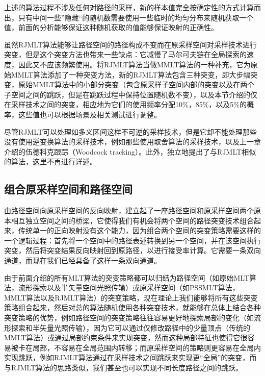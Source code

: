 上述的算法过程不涉及任何对路径的采样，新的样本值完全按确定性的方式计算而出，只有中间一些”隐藏“的随机数需要使用一些临时的均匀分布来随机获取一个值，前面的分析能够保证这种随机获取的值能够保证映射的正确性。

虽然RJMLT算法能够让路径空间的路径构成不变而在原采样空间对采样技术进行突变，但是这个突变方法也带来一些缺点：它减慢了马尔可夫链在全局探索的速度，因此又不应该频繁使用。\cite{a:ReversibleJumpMetropolisLightTransportusingInverseMappings}将RJMLT算法当做MMLT算法的一种补充，它为原始MMLT算法添加了一种突变方法，新的RJMLT算法包含三种突变，即大步幅突变，原始MMLT算法中的小部分突变（包含原采样子空间内部的突变以及在两个子空间之间的跳跃，但是在跳跃过程中保持位置随机数不变），以及本节介绍的仅在采样技术之间的突变，相应地为它们的使用频率分配10\%，85\%，以及5\%的概率，这些值也可以根据场景及相关测试进行调整。

尽管RJMLT可以处理如多义区间这样不可逆的采样技术，但是它却不能处理那些没有使用逆变换算法的采样技术，例如那些使用取舍算法的采样技术，以及上一章介绍的伍德科克跟踪（Woodcock tracking）\cite{a:TechniquesusedintheGEMcodeforMonteCarloneu-tronicscalculationsinreactorsandothersystemsofcomplexgeometry}。此外，\cite{a:ChartedMetropolisLightTransport}独立地提出了与RJMLT相似的算法，这里不再进行详述。





\subsection{组合原采样空间和路径空间}
由路径空间向原采样空间的反向映射，建立起了一座路径空间和原采样空间两个原本相互独立空间之间的桥梁，它使得我们有机会将两个空间的路径突变技术组合起来，传统单一的正向映射没有这个能力，因为组合两个空间的突变策略需要这样的一个逻辑过程：首先将一个空间中的路径表述转换到另一个空间，并在该空间执行突变，然后将突变结果反向映射回到原路径，以进行接受率计算。它需要一条双向通道，而现在我们已经具备了这样一条双向通道。

由于前面介绍的所有MLT算法的突变策略都可以归结为路径空间（如原始MLT算法，流形探索以及半矢量空间光照传输）或原采样空间（如PSSMLT算法，MMLT算法以及RJMLT算法）的突变策略，现在理论上我们能够将所有这些突变策略组合起来，然后对总的算法随机使用各种突变技术，就能够在总体上结合各种突变策略的优势，例如路径空间的突变策略往往容易更好地探索局部的变化（如流形探索和半矢量光照传输），因为它可以通过仅修改路径中的少量顶点（传统的MMLT算法）或通过局部约束条件来实现突变，然而这种局部特征也使得它很容易被卡在局部，不容易在全局范围内转移；而原采样空间的策略则更容易在全局内实现跳跃，例如RJMLT算法通过在采样技术之间跳跃来实现更“全局”的突变，而与RJMLT算法的思路类似，我们甚至也可以实现不同长度路径之间的跳跃。

